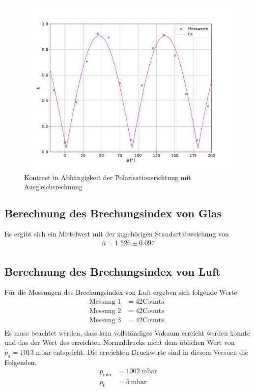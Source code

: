 \begin{figure}[H]
  \centering
  \includegraphics[width=\textwidth]{kontrast.pdf}
  \caption{Kontrast in Abhängigkeit der Polarisationsrichtung mit
  Ausgleichsrechnung}
  \label{fig:kontrast}
\end{figure}
\subsection{Berechnung des Brechungsindex von Glas}


Es ergibt sich ein Mittelwert mit der zugehörigen Standartabweichung von
\begin{align*}
  \bar{n} = 1.526 \pm 0.097 \\
\end{align*}
 




\subsection{Berechnung des Brechungsindex von Luft}

Für die Messungen des Brechungsindex von Luft ergeben sich folgende Werte
\begin{align*}
  \text{Messung 1} &= 42 \text{Counts} \\
  \text{Messung 2} &= 42 \text{Counts} \\
  \text{Messung 3} &= 42 \text{Counts} \, . \\
\end{align*}
Es muss beachtet werden, dass kein vollständiges Vakuum erreicht werden konnte
und das der Wert des erreichten Normaldrucks nicht dem üblichen Wert von
$p_a= \SI{1013}{\milli\bar}$ \cite{druck} entspricht. Die erreichten Druckwerte sind in
diesem Versuch die Folgenden.
\begin{align*}
  p_{\text{min}} &= \SI{1002}{\milli\bar} \\
  p_0            &= \SI{5}{\milli\bar} \\
\end{align*}


